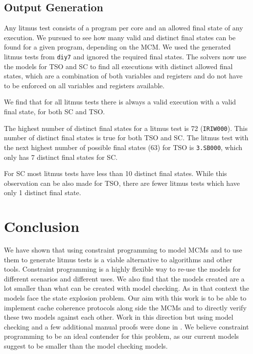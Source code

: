 \documentclass[runningheads]{llncs}
\begin{document}
\subsection{Output Generation}
Any litmus test consists of a program per core and an allowed final state of any execution.
We pursued to see how many valid and distinct final states can be found for a given program, depending on the MCM.
We used the generated litmus tests from {\tt{diy7}} and ignored the required final states.
The solvers now use the models for TSO and SC to find all executions with distinct allowed final states, which are a combination of both variables and registers and do not have to be enforced on all variables and registers available.

We find that for all litmus tests there is always a valid execution with a valid final state, for both SC and TSO.

The highest number of distinct final states for a litmus test is 72 ({\tt{IRIW000}}).
This number of distinct final states is true for both TSO and SC.
The litmus test with the next highest number of possible final states (63) for TSO is {\tt{3.SB000}}, which only has 7 distinct final states for SC.

For SC most litmus tests have less than 10 distinct final states.
While this observation can be also made for TSO, there are fewer litmus tests which have only 1 distinct final state.

\section{Conclusion}
We have shown that using constraint programming to model MCMs and to use them to generate litmus tests is a viable alternative to algorithms and other tools.
Constraint programming is a highly flexible way to re-use the models for different scenarios and different uses.
We also find that the models created are a lot smaller than what can be created with model checking. As in that context the models face the state explosion problem.
Our aim with this work is to be able to implement cache coherence protocols along side the MCMs and to directly verify these two models against each other.
Work in this direction but using model checking and a few additional manual proofs were done in \cite{banks2017verification}.
We believe constraint programming to be an ideal contender for this problem, as our current models suggest to be smaller than the model checking models.



\end{document}
